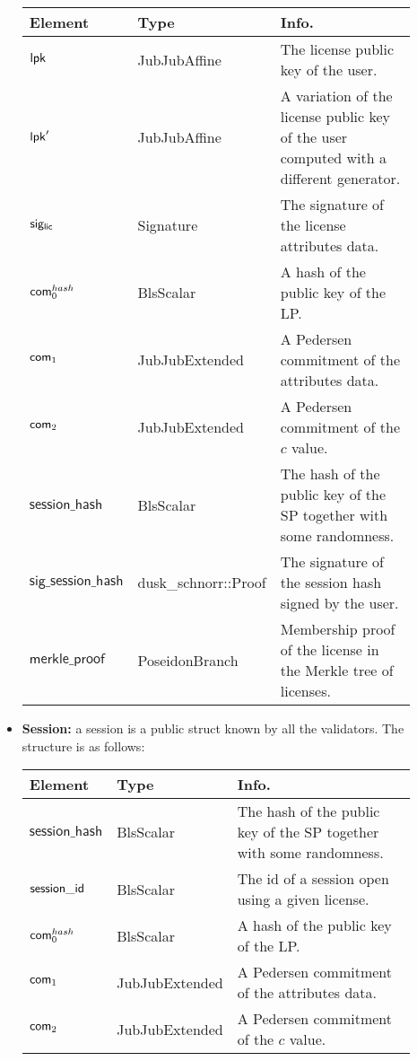 \begin{itemize}
    \begin{center}
        \begin{tabular}{ | p{0.15\linewidth} | p{0.2\linewidth} | p{0.55\linewidth} | } 
        \hline
        \textbf{Element} & \textbf{Type} & \textbf{Info.} \\
        \hline
        $\mathsf{lpk}$ & JubJubAffine & The license public key of the user.\\ 
        $\mathsf{lpk}'$ & JubJubAffine & A variation of the license public key of the user computed with a different generator.\\ 
        $\mathsf{sig_{lic}}$ & Signature & The signature of the license attributes data. \\ 
        $\mathsf{com}_0^{hash}$ & BlsScalar & A hash of the public key of the LP. \\ 
        $\mathsf{com}_1$ & JubJubExtended & A Pedersen commitment of the attributes data. \\ 
        $\mathsf{com}_2$ & JubJubExtended & A Pedersen commitment of the $c$ value. \\ 
        $\mathsf{session\_hash}$ & BlsScalar & The hash of the public key of the SP together with some randomness. \\ 
        $\mathsf{sig\_session\_hash}$ & dusk\_schnorr::Proof & The signature of the session hash signed by the user. \\ 
        $\mathsf{merkle\_proof}$ & PoseidonBranch & Membership proof of the license in the Merkle tree of licenses. \\ 

        \hline
        \end{tabular}
    \end{center}

    \item \textbf{Session:} a session is a public struct known by all the validators. The structure is as follows:

    \begin{center}
        \begin{tabular}{ | p{0.15\linewidth} | p{0.2\linewidth} | p{0.55\linewidth} | } 
        \hline
        \textbf{Element} & \textbf{Type} & \textbf{Info.} \\
        \hline
        $\mathsf{session\_hash}$ & BlsScalar & The hash of the public key of the SP together with some randomness. \\ 
        $\mathsf{session\_id}$ & BlsScalar & The id of a session open using a given license. \\ 
        $\mathsf{com}_0^{hash}$ & BlsScalar & A hash of the public key of the LP. \\ 
        $\mathsf{com}_1$ & JubJubExtended & A Pedersen commitment of the attributes data. \\ 
        $\mathsf{com}_2$ & JubJubExtended & A Pedersen commitment of the $c$ value. \\ 
        \hline
        \end{tabular}
    \end{center}


\end{itemize}
